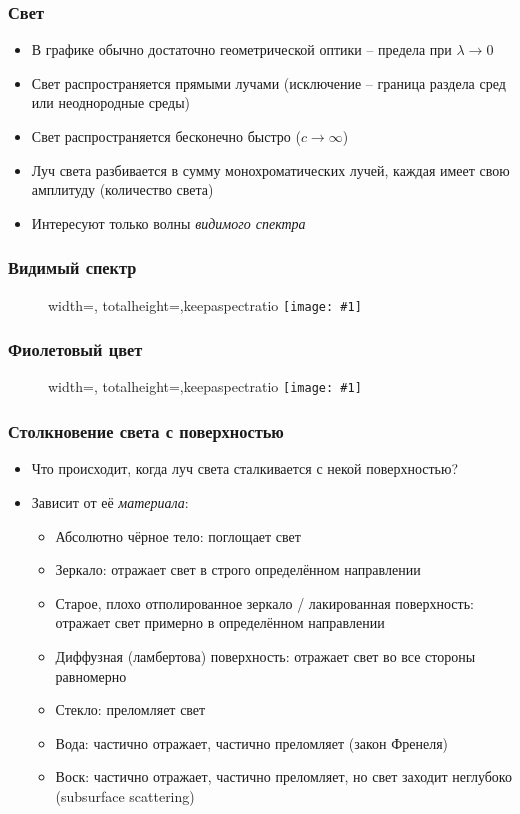 \documentclass{beamer}
\newcommand{\slideimage}[1]{
  \begin{figure}
    \begin{adjustbox}{width=\textwidth, totalheight=\textheight-2\baselineskip-2\baselineskip,keepaspectratio}
      \texttt{[image: \#1]}
    \end{adjustbox}
  \end{figure}
}
\begin{document}
\begin{frame}[fragile]
\frametitle{Свет}
\begin{itemize}
\item В графике обычно достаточно геометрической оптики -- предела при \begin{math}\lambda\rightarrow 0\end{math}
\pause
\item Свет распространяется прямыми лучами (исключение -- граница раздела сред или неоднородные среды)
\pause
\item Свет распространяется бесконечно быстро (\begin{math}c \rightarrow \infty\end{math})
\pause
\item Луч света разбивается в сумму монохроматических лучей, каждая имеет свою амплитуду (количество света)
\pause
\item Интересуют только волны \textit{видимого спектра}
\end{itemize}
\end{frame}

\begin{frame}[fragile]
\frametitle{Видимый спектр}
\slideimage{visible-spectrum.jpg}
\end{frame}

\begin{frame}[fragile]
\frametitle{Фиолетовый цвет}
\slideimage{blue-red-spectrum.png}
\end{frame}

\begin{frame}[fragile]
\frametitle{Столкновение света с поверхностью}
\begin{itemize}
\item Что происходит, когда луч света сталкивается с некой поверхностью?
\pause
\item Зависит от её \textit{материала}:
\pause
\begin{itemize}
\item Абсолютно чёрное тело: поглощает свет
\pause
\item Зеркало: отражает свет в строго определённом направлении
\pause
\item Старое, плохо отполированное зеркало / лакированная поверхность: отражает свет примерно в определённом направлении
\pause
\item Диффузная (ламбертова) поверхность: отражает свет во все стороны равномерно
\pause
\item Стекло: преломляет свет
\pause
\item Вода: частично отражает, частично преломляет (закон Френеля)
\pause
\item Воск: частично отражает, частично преломляет, но свет заходит неглубоко (subsurface scattering)
\end{itemize}
\end{itemize}
\end{frame}
\end{document}

